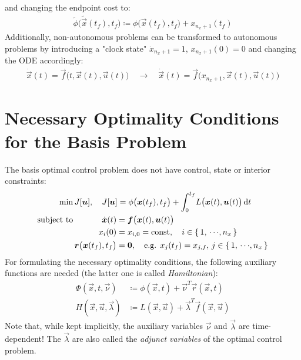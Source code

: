 	and changing the endpoint cost to:
	\begin{align*}
		\tilde{\phi}\big(\tilde{\vec{x}}(t_f), t_f\big) \coloneqq \phi\big(\vec{x}(t_f), t_f\big) + x_{n_x + 1}(t_f)
	\end{align*}
	Additionally, non-autonomous problems can be transformed to autonomous problems by introducing a "clock state" \( \dot{x}_{n_x + 1} = 1 \), \( x_{n_x + 1}(0) = 0 \) and changing the ODE accordingly:
	\begin{align*}
		\dot{\vec{x}}(t) = \vec{f}\big(t, \vec{x}(t), \vec{u}(t)\big) \quad\to\quad \dot{\vec{x}}(t) = \vec{f}\big(x_{n_x + 1}, \vec{x}(t), \vec{u}(t)\big)
	\end{align*}

	\section{Necessary Optimality Conditions for the Basis Problem}
		The basis optimal control problem does not have control, state or interior constraints:
		\begin{align*}
			\min                & \, J[\bm{u}],\quad J[\bm{u}] = \phi\big(\bm{x}(t_f), t_f\big) + \int_{0}^{t_f} \! L\big(\bm{x}(t), \bm{u}(t)\big) \dd{t} \\
			\mathrm{subject~to} & \,
			\begin{alignedat}[t]{2}
				\dot{\bm{x}}(t) &= \bm{f}\big(\bm{x}(t), \bm{u}(t)\big) \\
				x_i(0) &= x_{i, 0} = \operatorname{const},\quad i \in \{\, 1,\,\cdots\!,n_x \,\} \\
				\bm{r}\big(\bm{x}(t_f), t_f\big) &= \bm{0},\quad \text{e.g. } x_j(t_f) = x_{j, f},\, j \in \{\, 1,\,\cdots\!,n_x \,\}
			\end{alignedat}
		\end{align*}
		For formulating the necessary optimality conditions, the following auxiliary functions are needed (the latter one is called \emph{Hamiltonian}):
		\begin{align*}
			\Phi(\vec{x}, t, \vec{\nu})        & \coloneqq \phi(\vec{x}, t) + \vec{\nu}^T \vec{r}(\vec{x}, t)              \\
			H(\vec{x}, \vec{u}, \vec{\lambda}) & \coloneqq L(\vec{x}, \vec{u}) + \vec{\lambda}^T \vec{f}(\vec{x}, \vec{u})
		\end{align*}
		Note that, while kept implicitly, the auxiliary variables \(\vec{\nu}\) and \(\vec{\lambda}\) are time-dependent! The \(\vec{\lambda}\) are also called the \emph{adjunct variables} of the optimal control problem.

